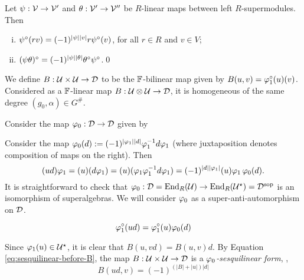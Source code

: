 \documentclass{amsbook}
\begin{document}
\begin{lemma}
    Let $\psi: \mathcal V \to \mathcal V'$ and $\theta: \mathcal V' \to \mathcal V''$ be $R$-linear maps between left $R$-supermodules. Then
    \begin{enumerate}[(i)]
        \item $\psi^\circ (rv) = (-1)^{|\psi||v|} r \psi^\circ (v)$, for all $r\in R$ and $v\in V$;
        \item $(\psi\theta)^\circ = (-1)^{|\psi||\theta|} \theta^\circ\psi^\circ$.\qed
    \end{enumerate}
\end{lemma}

We define $B: \mathcal U\times \mathcal U \to \mathcal{D}$ to be the $\mathbb{F}$-bilinear map given by $B(u, v) = \varphi_1^\circ (u)(v)$. Considered as a $\mathbb{F}$-linear map $B: \mathcal U\otimes \mathcal U \to \mathcal{D}$, it is homogeneous of the same degree $(g_0, \alpha)\in G^\#$.

Consider the map $\varphi_0: \mathcal{D} \to \mathcal{D}$ given by $ $

Consider the map $\varphi_0(d) := (-1)^{|\varphi_1||d|}\varphi_1^{-1} d \varphi_1$ (where juxtaposition denotes composition of maps on the right).
Then
\begin{equation}\label{eq:sesquilinear-before-B}
    (ud)\varphi_1 = (u) (d\varphi_1) =  (u)(\varphi_1\varphi_1^{-1} d \varphi_1) = (-1)^{|d||\varphi_1|}(u)\varphi_1 \,\varphi_0(d).
\end{equation}
It is straightforward to check that $\varphi_0: \mathcal{D} = \operatorname{End}_R(\mathcal U) \to \operatorname{End}_R(\mathcal U^\star) = \mathcal{D}^{\mathrm{sop}}$ is an isomorphism of superalgebras.
We will consider $\varphi_0$ as a super-anti-automorphism on $\mathcal{D}$.

\begin{equation}\label{eq:sesquilinear-with-vphi1-circ}
    \varphi_1^\circ (ud) = \varphi_1^\circ (u) \varphi_0 (d)
\end{equation}

Since $\varphi_1(u) \in \mathcal U^\star$, it is clear that $B(u,vd) = B(u,v)d$. By Equation \eqref{eq:sesquilinear-before-B}, the map $B: \mathcal U \times \mathcal U \to \mathcal{D}$ is a \emph{$\varphi_0$-sesquilinear form}, \ie,
\[
    B(ud, v) = (-1)^ {(|B| + |u|)|d|}
\]
\end{document}
